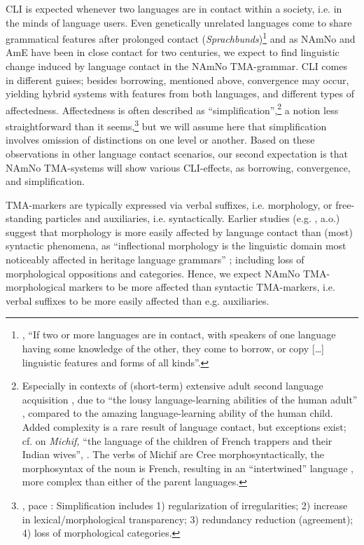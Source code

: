 \documentclass[output=paper]{langscibook}
\begin{document}
CLI is expected whenever two languages are in contact within a society, i.e. in the minds of language users. Even genetically unrelated languages come to share grammatical features after prolonged contact (\textit{Sprachbunds})\footnote{\citet[2]{Aikhenvald2006}, “If two or more languages are in contact, with speakers of one language having some knowledge of the other, they come to borrow, or copy […] linguistic features and forms of all kinds”.} and as NAmNo and AmE have been in close contact for two centuries, we expect to find linguistic change induced by language contact in the NAmNo TMA-grammar. CLI comes in different guises; besides borrowing, mentioned above, convergence may occur, yielding hybrid systems with features from both languages, and different types of affectedness. Affectedness is often described as “simplification”,\footnote{Especially in contexts of (short-term) extensive adult second language acquisition \citep{Trudgill2011}, due to “the lousy language-learning abilities of the human adult” \citep[372]{Trudgill2009}, compared to the amazing language-learning ability of the human child. Added complexity is a rare result of language contact, but exceptions exist; cf. \citet{Thomason2008} on \textit{Michif,} “the language of the children of French trappers and their Indian wives”, \citep[16]{Bossong2009}. The verbs of Michif are Cree morphosyntactically, the morphosyntax of the noun is French, resulting in an “intertwined” language \citep{ParkvallJacobs2023}, more complex than either of the parent languages.}  a notion less straightforward than it seems,\footnote{\citet{Trudgill2011}, pace \citet{Mühlhäusler1977}: Simplification includes 1) regularization of irregularities; 2) increase in lexical\slash morphological transparency; 3) redundancy reduction (agreement); 4) loss of morphological categories.}  but we will assume here that simplification involves omission of distinctions on one level or another. Based on these observations in other language contact scenarios, our second expectation is that NAmNo TMA-systems will show various CLI-effects, as borrowing, convergence, and simplification. 

TMA-markers are typically expressed via verbal suffixes, i.e. morphology, or free-standing particles and auxiliaries, i.e. syntactically. Earlier studies (e.g. \citealt{BenmamounEtAl2013, ScontrasEtAl2015, Lohndal2021, PutnamEtAl2021}, a.o.) suggest that morphology is more easily affected by language contact than (most) syntactic phenomena, as “inflectional morphology is the linguistic domain most noticeably affected in heritage language grammars”  \citep[54]{Montrul2016}; including loss of morphological oppositions and categories. Hence, we expect NAmNo TMA-morphological markers to be more affected than syntactic TMA-markers, i.e. verbal suffixes to be more easily affected than e.g. auxiliaries. 
\end{document}
